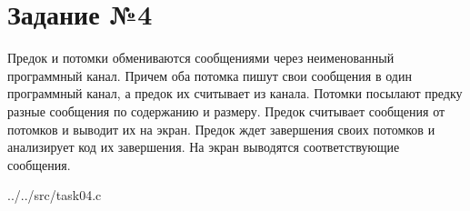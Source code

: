 \section*{Задание №4}

Предок и потомки обмениваются сообщениями через неименованный программный
канал. Причем оба потомка пишут свои сообщения в один программный канал, а
предок их считывает из канала. Потомки посылают предку разные сообщения
по содержанию и размеру. Предок считывает сообщения от потомков и выводит их на
экран. Предок ждет завершения своих потомков и анализирует код их завершения.
На экран выводятся соответствующие сообщения.

\begin{lstinputlisting}[
    caption={Системный вызов pipe()},
    label={lst:pipe}
]{../../src/task04.c}
\end{lstinputlisting}

